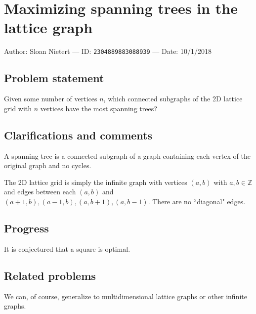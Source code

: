 
\section{Maximizing spanning trees in the lattice graph}

Author: Sloan Nietert --- ID: \verb`2304889883088939` --- Date: 10/1/2018

\subsection{Problem statement}

Given some number of vertices $n$, which connected subgraphs of the 2D lattice grid with $n$ vertices have the most spanning trees?

\subsection{Clarifications and comments}

A spanning tree is a connected subgraph of a graph containing each vertex of the original graph and no cycles.

The 2D lattice grid is simply the infinite graph with vertices $(a,b)$ with $a,b\in\mathbb{Z}$ and edges between each $(a,b)$ and $(a+1,b),(a-1,b),(a,b+1),(a,b-1)$. There are no ``diagonal" edges.

\subsection{Progress}

It is conjectured that a square is optimal.

\subsection{Related problems}

We can, of course, generalize to multidimensional lattice graphs or other infinite graphs.

